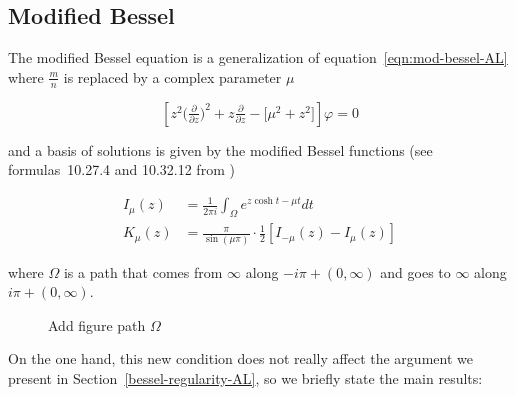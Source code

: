 \documentclass{article}
\begin{document}
\subsection{Modified Bessel}

The modified Bessel equation is a generalization of equation~\eqref{eqn:mod-bessel-AL} where $\frac{m}{n}$ is replaced by a complex parameter $\mu$

\begin{equation}\label{eqn:mod-bessel}
\left[z^2 \big(\tfrac{\partial}{\partial z}\big)^2 + z \tfrac{\partial}{\partial z} - \big[\mu^2 + z^2\big]\right] \varphi = 0
\end{equation}

and a basis of solutions is given by the modified Bessel functions (see formulas~10.27.4 and 10.32.12 from \cite{dlmf}) 

\begin{align*}
I_{\mu}(z)&=\frac{1}{2\pi i}\int_{\Omega} e^{z\cosh t - \mu t} dt \\
K_{\mu}(z)&=\frac{\pi}{\sin(\mu \pi)}\cdot \frac{1}{2}[ I_{-\mu}(z) - I_{\mu}(z)]
\end{align*} 

where $\Omega$ is a path that comes from $\infty$ along $-i \pi + (0, \infty)$ and goes to $\infty$ along $i \pi + (0, \infty)$.

\begin{figure}[h]
\caption{Add figure path $\Omega$}
\end{figure}

On the one hand, this new condition does not really affect the argument we present in Section~\ref{bessel-regularity-AL}, so we briefly state the main results: 
\end{document}
